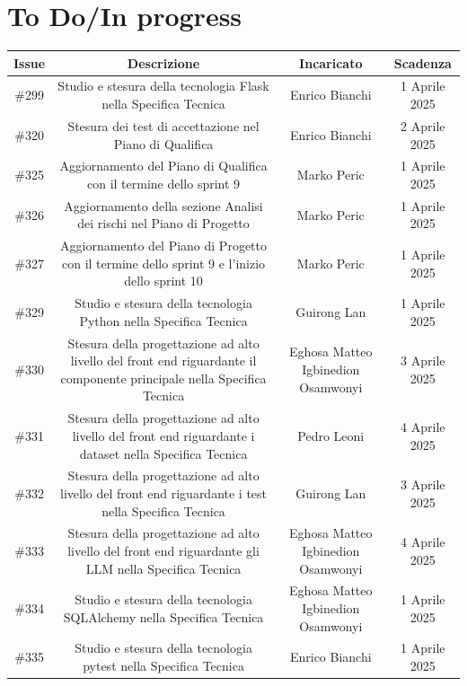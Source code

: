 \documentclass[a4paper, 12pt]{article}
\begin{document}
\section{To Do/In progress}
\begin{tabularx}{\textwidth}{|c|C|C|C|}
    \hline
        \textbf{Issue} & \textbf{Descrizione} & \textbf{Incaricato} & \textbf{Scadenza}\\
    \hline
        \#299 & Studio e stesura della tecnologia Flask nella Specifica Tecnica & Enrico Bianchi &  1 Aprile 2025\\
    \hline
        \#320 & Stesura dei test di accettazione nel Piano di Qualifica & Enrico Bianchi &  2 Aprile 2025 \\
    \hline
        \#325 & Aggiornamento del Piano di Qualifica con il termine dello sprint 9 & Marko Peric & 1 Aprile 2025 \\
    \hline
        \#326 & Aggiornamento della sezione Analisi dei rischi nel Piano di Progetto & Marko Peric & 1 Aprile 2025 \\
    \hline
        \#327 & Aggiornamento del Piano di Progetto con il termine dello sprint 9 e l'inizio dello sprint 10 & Marko Peric & 1 Aprile 2025 \\
    \hline
        \#329 & Studio e stesura della tecnologia Python nella Specifica Tecnica & Guirong Lan & 1 Aprile 2025 \\
    \hline
        \#330 & Stesura della progettazione ad alto livello  del front end riguardante il componente principale nella Specifica Tecnica & Eghosa Matteo Igbinedion Osamwonyi & 3 Aprile 2025 \\
    \hline
        \#331 & Stesura della progettazione ad alto livello  del front end riguardante i dataset nella Specifica Tecnica & Pedro Leoni & 4 Aprile 2025 \\
    \hline
        \#332 & Stesura della progettazione ad alto livello  del front end riguardante i test nella Specifica Tecnica & Guirong Lan & 3 Aprile 2025\\
    \hline 
        \#333 & Stesura della progettazione ad alto livello  del front end riguardante gli LLM nella Specifica Tecnica & Eghosa Matteo Igbinedion Osamwonyi & 4 Aprile 2025\\
    \hline
        \#334 & Studio e stesura della tecnologia SQLAlchemy nella Specifica Tecnica & Eghosa Matteo Igbinedion Osamwonyi & 1 Aprile 2025\\
    \hline
        \#335 & Studio e stesura della tecnologia pytest nella Specifica Tecnica & Enrico Bianchi & 1 Aprile 2025\\

\end{tabularx}
\end{document}
